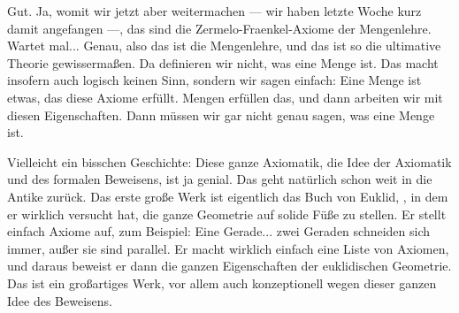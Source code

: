 \begin{spoken-clean}[00:06:36 - 00:08:20]
Gut. Ja, womit wir jetzt aber weitermachen --- wir haben letzte Woche kurz damit angefangen ---, das sind die Zermelo-Fraenkel-Axiome der Mengenlehre. Wartet mal... Genau, also das ist die Mengenlehre, und das ist so die ultimative Theorie gewissermaßen. Da definieren wir nicht, was eine Menge ist. Das macht insofern auch logisch keinen Sinn, sondern wir sagen einfach: Eine Menge ist etwas, das diese Axiome erfüllt. Mengen erfüllen das, und dann arbeiten wir mit diesen Eigenschaften. Dann müssen wir gar nicht genau sagen, was eine Menge ist.

Vielleicht ein bisschen Geschichte: Diese ganze Axiomatik, die Idee der Axiomatik und des formalen Beweisens, ist ja genial. Das geht natürlich schon weit in die Antike zurück. Das erste große Werk ist eigentlich das Buch von Euklid, , in dem er wirklich versucht hat, die ganze Geometrie auf solide Füße zu stellen. Er stellt einfach Axiome auf, zum Beispiel: Eine Gerade... zwei Geraden schneiden sich immer, außer sie sind parallel. Er macht wirklich einfach eine Liste von Axiomen, und daraus beweist er dann die ganzen Eigenschaften der euklidischen Geometrie. Das ist ein großartiges Werk, vor allem auch konzeptionell wegen dieser ganzen Idee des Beweisens.
\end{spoken-clean}

